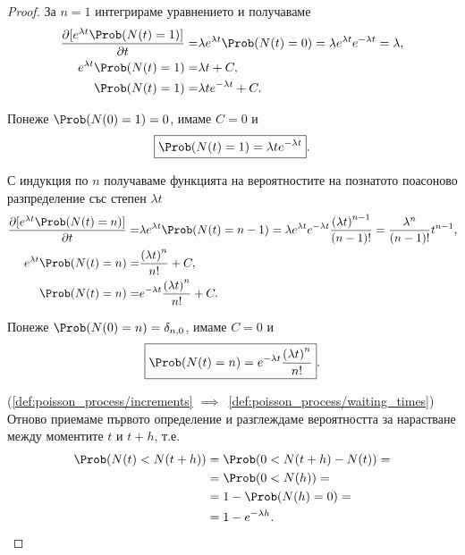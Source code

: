 \documentclass[numbers=endperiod, bibliography=totocnumbered]{scrartcl}
\begin{document}
\begin{proof}
  За \( n = 1 \) интегрираме уравнението и получаваме
  \begin{align*}
    \frac {\partial [e^{\lambda t} \Prob(N(t) = 1)]} {\partial t}
    =&
    \lambda e^{\lambda t} \Prob(N(t) = 0)
    =
    \lambda e^{\lambda t} e^{-\lambda t}
    =
    \lambda,
    \\
    e^{\lambda t} \Prob(N(t) = 1)
    =&
    \lambda t + C,
    \\
    \Prob(N(t) = 1)
    =&
    \lambda t e^{-\lambda t} + C.
  \end{align*}

  Понеже \( \Prob(N(0) = 1) = 0 \), имаме \( C = 0 \) и
  \begin{equation*}
    \boxed{\Prob(N(t) = 1) = \lambda t e^{-\lambda t}}.
  \end{equation*}

  С индукция по \( n \) получаваме функцията на вероятностите на познатото поасоново разпределение със степен \( \lambda t \)
  \begin{align*}
    \frac {\partial [e^{\lambda t} \Prob(N(t) = n)]} {\partial t}
    =&
    \lambda e^{\lambda t} \Prob(N(t) = n - 1)
    =
    \lambda e^{\lambda t} e^{-\lambda t} \frac {{(\lambda t)}^{n-1}} {(n-1)!}
    =
    \frac {\lambda^n} {(n-1)!} t^{n-1},
    \\
    e^{\lambda t} \Prob(N(t) = n)
    =&
    \frac {{(\lambda t)}^n} {n!} + C,
    \\
    \Prob(N(t) = n)
    =&
    e^{-\lambda t} \frac {{(\lambda t)}^n} {n!} + C.
  \end{align*}

  Понеже \( \Prob(N(0) = n) = \delta_{n,0} \), имаме \( C = 0 \) и
  \begin{equation*}
    \boxed{\Prob(N(t) = n) = e^{-\lambda t} \frac {{(\lambda t)}^n} {n!}}.
  \end{equation*}

  (\ref{def:poisson_process/increments} \( \implies \)~\ref{def:poisson_process/waiting_times}) Отново приемаме първото определение и разглеждаме вероятността за нарастване между моментите \( t \) и \( t+h \), т.е.
  \begin{align*}
    \Prob(N(t) < N(t+h))
    &=
    \Prob(0 < N(t+h) - N(t))
    = \\ &=
    \Prob(0 < N(h))
    = \\ &=
    1 - \Prob(N(h) = 0)
    = \\ &=
    1 - e^{-\lambda h}.
  \end{align*}


\end{proof}
\end{document}
